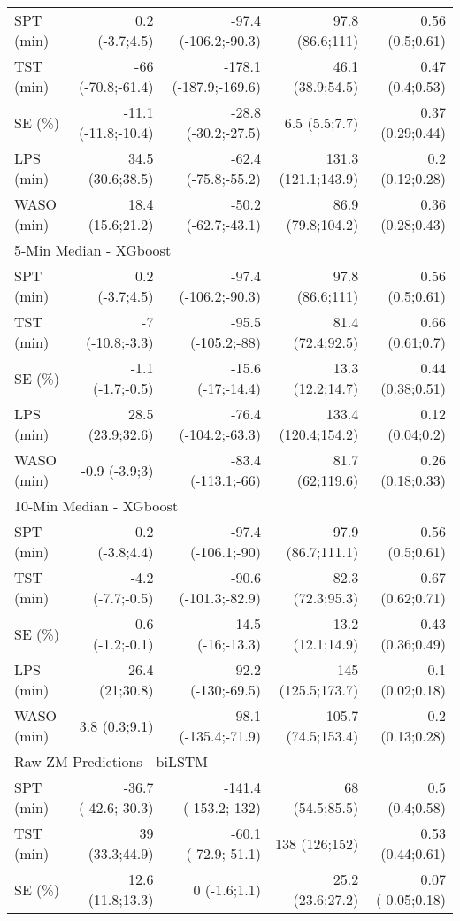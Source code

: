 \documentclass[
  10pt,
]{scrbook}
\begin{document}
\begin{longtable}{lrrrr}
\midrule
SPT (min) & 0.2 (-3.7;4.5) & -97.4 (-106.2;-90.3) & 97.8 (86.6;111) & 0.56 (0.5;0.61) \\ 
TST (min) & -66 (-70.8;-61.4) & -178.1 (-187.9;-169.6) & 46.1 (38.9;54.5) & 0.47 (0.4;0.53) \\ 
SE (\%) & -11.1 (-11.8;-10.4) & -28.8 (-30.2;-27.5) & 6.5 (5.5;7.7) & 0.37 (0.29;0.44) \\ 
LPS (min) & 34.5 (30.6;38.5) & -62.4 (-75.8;-55.2) & 131.3 (121.1;143.9) & 0.2 (0.12;0.28) \\ 
WASO (min) & 18.4 (15.6;21.2) & -50.2 (-62.7;-43.1) & 86.9 (79.8;104.2) & 0.36 (0.28;0.43) \\ 
\midrule
\multicolumn{5}{l}{5-Min Median - XGboost} \\ 
\midrule
SPT (min) & 0.2 (-3.7;4.5) & -97.4 (-106.2;-90.3) & 97.8 (86.6;111) & 0.56 (0.5;0.61) \\ 
TST (min) & -7 (-10.8;-3.3) & -95.5 (-105.2;-88) & 81.4 (72.4;92.5) & 0.66 (0.61;0.7) \\ 
SE (\%) & -1.1 (-1.7;-0.5) & -15.6 (-17;-14.4) & 13.3 (12.2;14.7) & 0.44 (0.38;0.51) \\ 
LPS (min) & 28.5 (23.9;32.6) & -76.4 (-104.2;-63.3) & 133.4 (120.4;154.2) & 0.12 (0.04;0.2) \\ 
WASO (min) & -0.9 (-3.9;3) & -83.4 (-113.1;-66) & 81.7 (62;119.6) & 0.26 (0.18;0.33) \\ 
\midrule
\multicolumn{5}{l}{10-Min Median - XGboost} \\ 
\midrule
SPT (min) & 0.2 (-3.8;4.4) & -97.4 (-106.1;-90) & 97.9 (86.7;111.1) & 0.56 (0.5;0.61) \\ 
TST (min) & -4.2 (-7.7;-0.5) & -90.6 (-101.3;-82.9) & 82.3 (72.3;95.3) & 0.67 (0.62;0.71) \\ 
SE (\%) & -0.6 (-1.2;-0.1) & -14.5 (-16;-13.3) & 13.2 (12.1;14.9) & 0.43 (0.36;0.49) \\ 
LPS (min) & 26.4 (21;30.8) & -92.2 (-130;-69.5) & 145 (125.5;173.7) & 0.1 (0.02;0.18) \\ 
WASO (min) & 3.8 (0.3;9.1) & -98.1 (-135.4;-71.9) & 105.7 (74.5;153.4) & 0.2 (0.13;0.28) \\ 
\midrule
\multicolumn{5}{l}{Raw ZM Predictions - biLSTM} \\ 
\midrule
SPT (min) & -36.7 (-42.6;-30.3) & -141.4 (-153.2;-132) & 68 (54.5;85.5) & 0.5 (0.4;0.58) \\ 
TST (min) & 39 (33.3;44.9) & -60.1 (-72.9;-51.1) & 138 (126;152) & 0.53 (0.44;0.61) \\ 
SE (\%) & 12.6 (11.8;13.3) & 0 (-1.6;1.1) & 25.2 (23.6;27.2) & 0.07 (-0.05;0.18) \\ 

\end{longtable}
\end{document}
